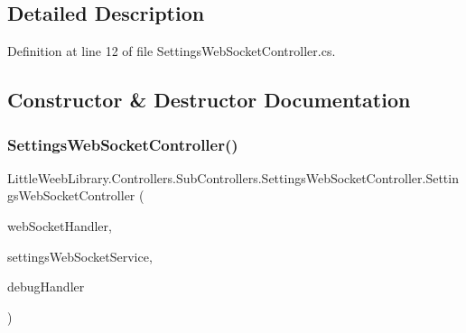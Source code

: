 \subsection{Detailed Description}


Definition at line 12 of file Settings\+Web\+Socket\+Controller.\+cs.



\subsection{Constructor \& Destructor Documentation}
\mbox{\label{class_little_weeb_library_1_1_controllers_1_1_sub_controllers_1_1_settings_web_socket_controller_a81701a5495065390949f1672fcac1f40}} 
\subsubsection{\texorpdfstring{Settings\+Web\+Socket\+Controller()}{SettingsWebSocketController()}}
{\footnotesize\ttfamily Little\+Weeb\+Library.\+Controllers.\+Sub\+Controllers.\+Settings\+Web\+Socket\+Controller.\+Settings\+Web\+Socket\+Controller (\begin{DoxyParamCaption}\item[{\mbox{\hyperlink{interface_little_weeb_library_1_1_handlers_1_1_i_web_socket_handler}{I\+Web\+Socket\+Handler}}}]{web\+Socket\+Handler,  }\item[{\mbox{\hyperlink{interface_little_weeb_library_1_1_services_1_1_i_settings_web_socket_service}{I\+Settings\+Web\+Socket\+Service}}}]{settings\+Web\+Socket\+Service,  }\item[{\mbox{\hyperlink{interface_little_weeb_library_1_1_handlers_1_1_i_debug_handler}{I\+Debug\+Handler}}}]{debug\+Handler }\end{DoxyParamCaption})}



